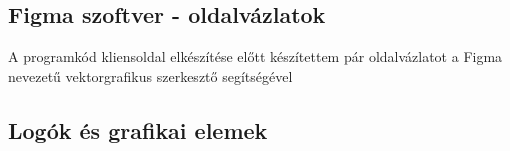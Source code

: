 \subsection{Figma szoftver - oldalvázlatok}
A programkód kliensoldal elkészítése előtt készítettem pár oldalvázlatot a Figma nevezetű vektorgrafikus szerkesztő segítségével

\subsection{Logók és grafikai elemek}







